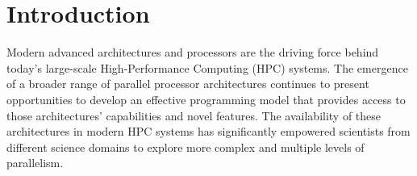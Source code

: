 \documentclass[conference]{IEEEtran}
\begin{document}
\section{Introduction}\label{sec:intro}

Modern advanced architectures and processors are the driving force behind
today’s large-scale High-Performance Computing (HPC) systems. The emergence of
a broader range of parallel processor architectures continues to present
opportunities to develop an effective programming model that provides access to
those architectures' capabilities and novel features.
%
The availability of these architectures in modern HPC systems has significantly
empowered scientists from different science domains to explore  more complex and
multiple levels of parallelism.
\end{document}
